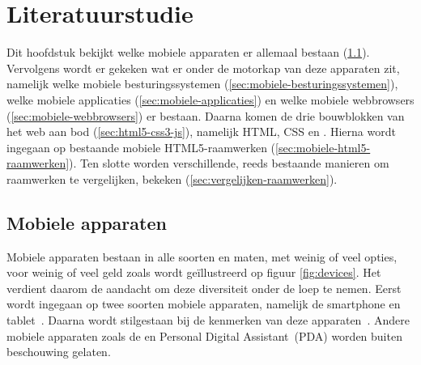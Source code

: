 \chapter{Literatuurstudie}
\label{chap:literatuurstudie}

Dit hoofdstuk bekijkt welke mobiele apparaten er allemaal bestaan (\ref{sec:mobiele-apparaten}). 
Vervolgens wordt er gekeken wat er onder de motorkap van deze apparaten zit, namelijk welke mobiele besturingssystemen (\ref{sec:mobiele-besturingssystemen}), welke mobiele applicaties (\ref{sec:mobiele-applicaties}) en welke mobiele webbrowsers (\ref{sec:mobiele-webbrowsers}) er bestaan. 
Daarna komen de drie bouwblokken van het web aan bod (\ref{sec:html5-css3-js}), namelijk HTML, CSS en \js{}.
Hierna wordt ingegaan op bestaande mobiele HTML5-raamwerken (\ref{sec:mobiele-html5-raamwerken}).  
Ten slotte worden verschillende, reeds bestaande manieren om raamwerken te vergelijken, bekeken (\ref{sec:vergelijken-raamwerken}).


\section{Mobiele apparaten}
\label{sec:mobiele-apparaten}
Mobiele apparaten bestaan in alle soorten en maten, met weinig of veel opties, voor weinig of veel geld zoals wordt geïllustreerd op figuur \ref{fig:devices}. 
Het verdient daarom de aandacht om deze diversiteit onder de loep te nemen. 
Eerst wordt ingegaan op twee soorten mobiele apparaten, namelijk de smartphone en tablet~\cite{GCF2013}.
Daarna wordt stilgestaan bij de kenmerken van deze apparaten~\cite{PhilDutson2012}.
Andere mobiele apparaten zoals de  en Personal Digital Assistant~(PDA) worden buiten beschouwing gelaten.

